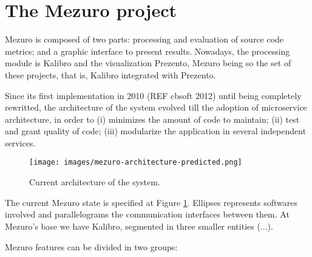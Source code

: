 \documentclass{llncs}
\begin{document}
\section{The Mezuro project}
\label{sec:mezuro}

Mezuro is composed of two parts: processing and evaluation of source code
metrics; and a graphic interface to present results. Nowadays, the processing
module is Kalibro and the visualization Prezento, Mezuro being so the set of
these projects, that is, Kalibro integrated with Prezento.

Since its first implementation in 2010 (REF cbsoft 2012) until being completely
rewritted, the architecture of the system evolved till the adoption of 
microservice architecture, in order to (i) minimizes the amount of code to
maintain;
(ii) test and grant quality of code;
(iii) modularize the application in several independent services.

\begin{figure}[H]
  \centering
    \texttt{[image: images/mezuro-architecture-predicted.png]}
  \caption{Current architecture of the system.}
  \label{fig:architecture-2}
\end{figure}


The current Mezuro state is specified at Figure \ref{fig:architecture-2}. Ellipses represents
softwares involved and parallelograms the communication interfaces between them. At Mezuro's
base we have Kalibro, segmented in three smaller entities (...).

Mezuro features can be divided in two groups:
\end{document}
